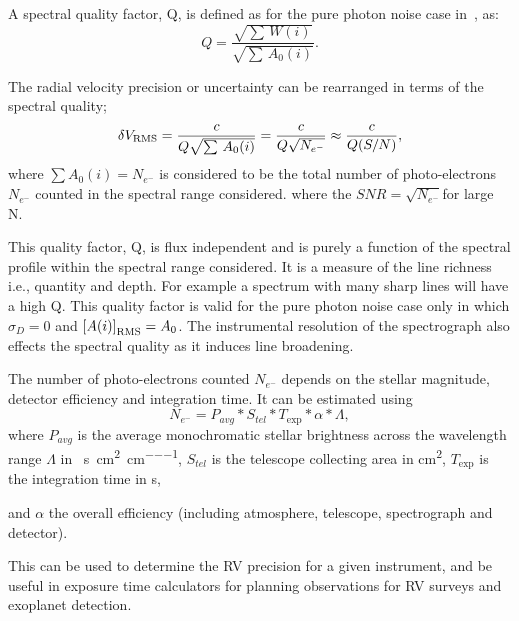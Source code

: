 A spectral quality factor, Q, is defined as for the pure photon noise case in~\cite{connes_absolute_1985, connes_demonstration_1996}, as:
\begin{equation}
Q = \frac{\sqrt{\sum{\,W(i)}}}{\sqrt{\sum{\,A_0(i)}}}.
\end{equation}

The radial velocity precision or uncertainty can be rearranged in terms of the spectral quality;
\begin{equation}
    \delta V_{\textrm{RMS}} = \frac{c}{Q \sqrt{\sum {\,A_0(i)}}} = \frac{c}{Q \sqrt{{N}_{{e}^{-}}}} \approx \frac{c}{Q (S/N)},
\end{equation}
where \(\sum A_0(i) = {N}_{{e}^{-}}\) is considered to be the total number of photo-electrons \({N}_{{e}^{-}}\) counted in the spectral range considered.
where the \({SNR}=\sqrt{N_{{e}^{-}}}\)for large N. 


This quality factor, Q, is flux independent and is purely a function of the spectral profile within the spectral range considered.
It is a measure of the line richness i.e., quantity and depth.
For example a spectrum with many sharp lines will have a high Q.
This quality factor is valid for the pure photon noise case only in which \(\sigma_{D} =0\) and \({[A(i)]}_{\textrm{RMS}} = A_0\).
The instrumental resolution of the spectrograph also effects the spectral quality as it induces line broadening.

The number of photo-electrons counted \(N_{{e}^{-}}\) depends on the stellar magnitude, detector efficiency and integration time.
It can be estimated using
\begin{equation}
     N_{{e}^{-}} = P_{avg} * S_{tel} * T_{\textrm{exp}} * \alpha* \Lambda,
\end{equation}
where \(P_{avg}\) is the average monochromatic stellar brightness
across the wavelength range \(\Lambda\) in \si{\photons\per\second\per\centi\metre\squared\per\centi\metre},
\(S_{tel}\) is the telescope collecting area in \si{\centi\metre\squared},
\(T_{\textrm{exp}}\) is the integration time in \si{\second},

and \(\alpha\) the overall efficiency (including atmosphere, telescope, spectrograph and detector).

This can be used to determine the {RV} precision for a given instrument, and be useful in exposure time calculators for planning observations for RV surveys and exoplanet detection.

